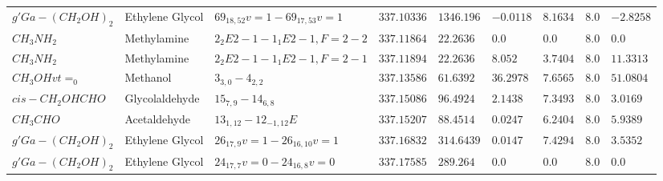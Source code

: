\documentclass{aa}
\begin{document}
\begin{table}
\begin{tabular}{l l l l l l l l l}
$g'Ga-(CH_{2}OH)_{2}$ & Ethylene Glycol & $69_{18,52}v=1-69_{17,53}v=1$ & $337.10336$ & $1346.196$ & $-0.0118$ & $8.1634$ & $8.0$ & $-2.8258$\\
$CH_{3}NH_{2}$ & Methylamine & $2_{2}E2-1-1_{1}E2-1,F=2-2$ & $337.11864$ & $22.2636$ & $0.0$ & $0.0$ & $8.0$ & $0.0$\\
$CH_{3}NH_{2}$ & Methylamine & $2_{2}E2-1-1_{1}E2-1,F=2-1$ & $337.11894$ & $22.2636$ & $8.052$ & $3.7404$ & $8.0$ & $11.3313$\\
$CH_{3}OHvt=_{0}$ & Methanol & $3_{3,0}-4_{2,2}$ & $337.13586$ & $61.6392$ & $36.2978$ & $7.6565$ & $8.0$ & $51.0804$\\
$cis-CH_{2}OHCHO$ & Glycolaldehyde & $15_{7,9}-14_{6,8}$ & $337.15086$ & $96.4924$ & $2.1438$ & $7.3493$ & $8.0$ & $3.0169$\\
$CH_{3}CHO$ & Acetaldehyde & $13_{1,12}-12_{-1,12}E$ & $337.15207$ & $88.4514$ & $0.0247$ & $6.2404$ & $8.0$ & $5.9389$\\
$g'Ga-(CH_{2}OH)_{2}$ & Ethylene Glycol & $26_{17,9}v=1-26_{16,10}v=1$ & $337.16832$ & $314.6439$ & $0.0147$ & $7.4294$ & $8.0$ & $3.5352$\\
$g'Ga-(CH_{2}OH)_{2}$ & Ethylene Glycol & $24_{17,7}v=0-24_{16,8}v=0$ & $337.17585$ & $289.264$ & $0.0$ & $0.0$ & $8.0$ & $0.0$\\
    \hline                  
    \end{tabular}
\end{table}
\end{document}
